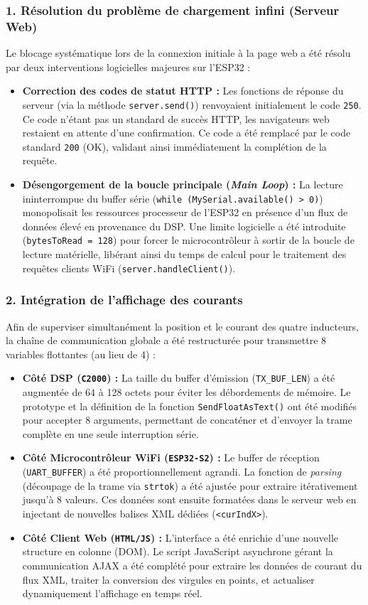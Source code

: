 \subsubsection*{1. Résolution du problème de chargement infini (Serveur Web)}
Le blocage systématique lors de la connexion initiale à la page web a été résolu par deux interventions logicielles majeures sur l'ESP32 :
\begin{itemize}
  \item \textbf{Correction des codes de statut HTTP :} Les fonctions de réponse du serveur (via la méthode \texttt{server.send()}) renvoyaient initialement le code \texttt{250}. Ce code n'étant pas un standard de succès HTTP, les navigateurs web restaient en attente d'une confirmation. Ce code a été remplacé par le code standard \texttt{200} (OK), validant ainsi immédiatement la complétion de la requête.
  \item \textbf{Désengorgement de la boucle principale (\textit{Main Loop}) :} La lecture ininterrompue du buffer série (\texttt{while (MySerial.available() > 0)}) monopolisait les ressources processeur de l'ESP32 en présence d'un flux de données élevé en provenance du DSP. Une limite logicielle a été introduite (\texttt{bytesToRead = 128}) pour forcer le microcontrôleur à sortir de la boucle de lecture matérielle, libérant ainsi du temps de calcul pour le traitement des requêtes clients WiFi (\texttt{server.handleClient()}).
\end{itemize}

\subsubsection*{2. Intégration de l'affichage des courants}
Afin de superviser simultanément la position et le courant des quatre inducteurs, la chaîne de communication globale a été restructurée pour transmettre 8 variables flottantes (au lieu de 4) :
\begin{itemize}
  \item \textbf{Côté DSP (\texttt{C2000}) :} La taille du buffer d'émission (\texttt{TX\_BUF\_LEN}) a été augmentée de 64 à 128 octets pour éviter les débordements de mémoire. Le prototype et la définition de la fonction \texttt{SendFloatAsText()} ont été modifiés pour accepter 8 arguments, permettant de concaténer et d'envoyer la trame complète en une seule interruption série.
  \item \textbf{Côté Microcontrôleur WiFi (\texttt{ESP32-S2}) :} Le buffer de réception (\texttt{UART\_BUFFER}) a été proportionnellement agrandi. La fonction de \textit{parsing} (découpage de la trame via \texttt{strtok}) a été ajustée pour extraire itérativement jusqu'à 8 valeurs. Ces données sont ensuite formatées dans le serveur web en injectant de nouvelles balises XML dédiées (\texttt{<curIndX>}).
  \item \textbf{Côté Client Web (\texttt{HTML/JS}) :} L'interface a été enrichie d'une nouvelle structure en colonne (DOM). Le script JavaScript asynchrone gérant la communication AJAX a été complété pour extraire les données de courant du flux XML, traiter la conversion des virgules en points, et actualiser dynamiquement l'affichage en temps réel.
\end{itemize}

